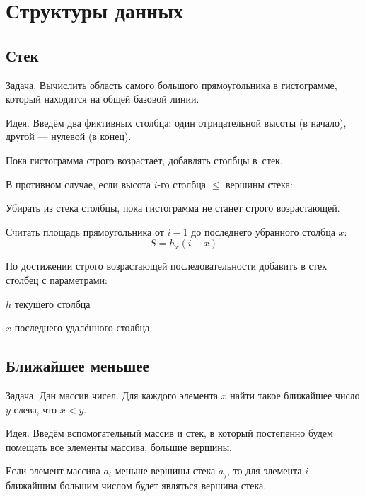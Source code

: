 \section{Структуры данных}

\subsection{Стек}

\begin{theorem}
{\bold Задача.} Вычислить область самого большого прямоугольника в гистограмме, который находится на общей базовой линии.
\end{theorem}

{\bold Идея.} Введём два фиктивных столбца: один отрицательной высоты {\ital (в начало)}, другой --- нулевой {\ital (в конец)}.

Пока гистограмма {\ital строго возрастает}, добавлять столбцы в~стек.

В противном случае, если высота $i$-го столбца $\leq$ вершины стека:
\begin{list*}[][\#]
\item Убирать из стека столбцы, пока гистограмма не станет {\ital строго возрастающей}.
\item Считать площадь прямоугольника от $i-1$ до последнего убранного столбца $x$:
$$S=h_x(i-x)$$
\item По достижении строго возрастающей последовательности добавить в стек столбец с параметрами:
\begin{list*}
\item $h$ текущего столбца
\item $x$ последнего удалённого столбца
\end{list*}
\end{list*}

\subsection{Ближайшее меньшее}

\begin{theorem}
{\bold Задача.} Дан массив чисел. Для каждого элемента $x$ найти такое ближайшее число $y$ слева, что $x\less y$.
\end{theorem}

{\bold Идея.} Введём вспомогательный массив и {\ital стек}, в который постепенно будем помещать все элементы массива, большие вершины.

Если элемент массива $a_i$ меньше вершины стека $a_j$, то для элемента $i$ ближайшим большим числом будет являться вершина стека.

